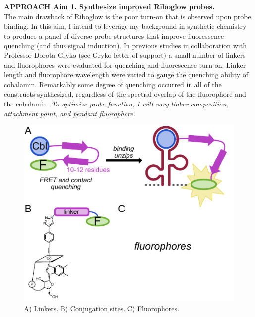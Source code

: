 \textbf{APPROACH \underline{Aim 1.} Synthesize improved Riboglow probes.}\\
The main drawback of Riboglow is the poor turn-on that is observed upon probe binding. In this aim, I intend to leverage my background in synthetic chemistry to produce a panel of diverse probe structures that improve fluorescence quenching (and thus signal induction). In previous studies in collaboration with Professor Dorota Gryko (see Gryko letter of support) a small number of linkers and fluorophores were evaluated for quenching and fluorescence turn-on. Linker length and fluorophore wavelength were varied to gauge the quenching ability of cobalamin. Remarkably some degree of quenching occurred in all of the constructs synthesized, regardless of the spectral overlap of the fluorophore and the cobalamin. \textit{To optimize probe function, I will vary linker composition, attachment point, and pendant fluorophore.}

\begin{figure}
\begin{centering}
\includegraphics[width=\textwidth]{figures/aim1v2.pdf}

\end{centering}
\footnotesize
\caption{\label{figure:aim1}
A) Linkers. B) Conjugation sites. C) Fluorophores.
}
\end{figure}

